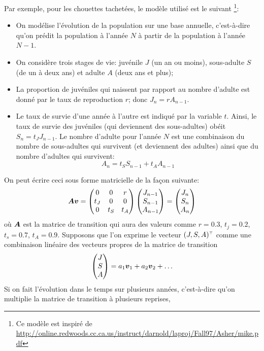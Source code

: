 Par exemple, pour les chouettes tachetées, le modèle utilisé est le suivant
\footnote{Ce modèle est inspiré de 
\url{http://online.redwoods.cc.ca.us/instruct/darnold/laproj/Fall97/Asher/mike.pdf}}:
\begin{itemize}
\item On modélise l'évolution de la population sur une base annuelle, c'est-à-dire
qu'on prédit la population à l'année $N$ à partir de la population à l'année $N-1$.
\item On considère trois stages de vie: juvénile $J$ (un an ou moins),
sous-adulte $S$ (de un à deux ans) et adulte $A$ (deux ans et plus);
\item La proportion de juvéniles qui naissent par rapport au nombre
d'adulte est donné par le taux de reproduction $r$; donc $J_n = r A_{n-1}$.
\item Le taux de survie d'une année à l'autre est indiqué par la variable $t$.
Ainsi, le taux de survie des juvéniles (qui deviennent des sous-adultes) obéit
$S_n = t_J J_{n-1}$. Le nombre d'adulte pour l'année $N$ est une combinaison
du nombre de sous-adultes qui survivent (et deviennent des adultes) ainsi que
du nombre d'adultes qui survivent:
\[
A_n = t_S S_{n-1} + t_A A_{n-1}
\]
\end{itemize}
On peut écrire ceci sous forme matricielle de la façon suivante:
\[
\boldsymbol{A}\boldsymbol{v} = 
\begin{pmatrix}
0 & 0 & r \\
t_J & 0 & 0 \\
0 & t_S & t_A
\end{pmatrix}
\begin{pmatrix}
J_{n-1}\\
S_{n-1} \\
A_{n-1}
\end{pmatrix}
=
\begin{pmatrix}
J_n \\
S_n \\
A_n
\end{pmatrix}
\]
où $\boldsymbol{A}$ est la matrice de transition qui aura des
valeurs comme $r=0.3$, $t_j = 0.2$, $t_s=0.7$, $t_A=0.9$.
Supposons que l'on exprime le vecteur $\transp{(J, S, A)}$ comme une combinaison linéaire
des vecteurs propres de la matrice de transition
\[
\begin{pmatrix}
J\\S\\A
\end{pmatrix}
= a_1 \boldsymbol{v}_1 + a_2 \boldsymbol{v}_2 + \ldots
\]  Si on fait l'évolution dans le temps
sur plusieurs années, c'est-à-dire qu'on multiplie la matrice de transition à plusieurs reprises,
